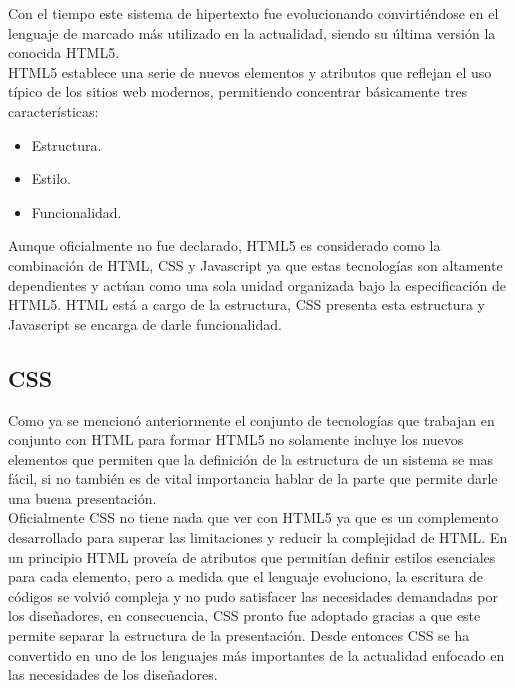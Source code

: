 Con el tiempo este sistema de hipertexto fue evolucionando convirti\'endose en el lenguaje de marcado m\'as utilizado en la actualidad, siendo su \'ultima versi\'on la conocida HTML5.\\

HTML5 establece una serie de nuevos elementos y atributos que reflejan el uso t\'ipico de los sitios web modernos, permitiendo concentrar b\'asicamente tres caracter\'isticas:

\begin{itemize}
	\item Estructura.
	\item Estilo.
	\item Funcionalidad.
\end{itemize}

Aunque oficialmente no fue declarado, HTML5 es considerado como la combinaci\'on de HTML, CSS y Javascript ya que estas tecnolog\'ias son altamente dependientes y act\'uan como una sola unidad organizada bajo  la especificaci\'on de HTML5. HTML est\'a a cargo de la estructura, CSS presenta esta estructura y Javascript se encarga de darle funcionalidad.

\subsection{CSS}

Como ya se mencion\'o anteriormente el conjunto de tecnolog\'ias que trabajan en conjunto con HTML para formar HTML5 no solamente incluye los nuevos elementos que permiten que la definici\'on de la estructura de un sistema se mas f\'acil, si no tambi\'en es de vital importancia hablar de la parte que permite darle una buena presentaci\'on.\\

Oficialmente CSS no tiene nada que ver con HTML5 ya que es un complemento desarrollado para superar las limitaciones y reducir la complejidad de HTML. En un principio HTML prove\'ia de atributos que permit\'ian definir estilos esenciales para cada elemento, pero a medida que el lenguaje evoluciono, la escritura de c\'odigos se volvi\'o compleja  y no pudo satisfacer las necesidades demandadas por los dise\~nadores, en consecuencia, CSS pronto fue adoptado gracias a que este permite separar la estructura de la presentaci\'on. Desde entonces CSS se ha convertido en uno de los lenguajes m\'as importantes de la actualidad enfocado en las necesidades de los dise\~nadores.\\


